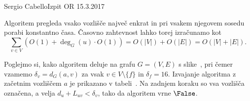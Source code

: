 \begin{naloga}{Sergio Cabello}{Izpit OR 15.3.2017}
\begin{odgovor}
Algoritem pregleda vsako vozlišče največ enkrat in pri vsakem njegovem sosedu porabi konstantno časa.
Časovno zahtevnost lahko torej izračunamo kot 
$$
\sum_{v \in V}\left(O(1) + \deg_G(u) \cdot O(1)\right)
= O(|V|) + O(|E|) = O(|V| + |E|).
$$

Poglejmo si, kako algoritem deluje na grafu $G = (V, E)$ s slike~\fig,
pri čemer vzamemo $\delta_v = d_G(a, v)$ za vsak $v \in V \setminus \{f\}$
in $\delta_f = 16$.
Izvajanje algoritma z začetnim vozliščem $a$ je prikazano v tabeli~\tab.
Na zadnjem koraku so vsa vozlišča označena, a velja $d_u + L_{uv} < \delta_v$,
tako da algoritem vrne $\False$.

\begin{slika}
\pgfslika
{}
\end{slika}

\begin{tabela}
\end{tabela}

\end{odgovor}
\end{naloga}
